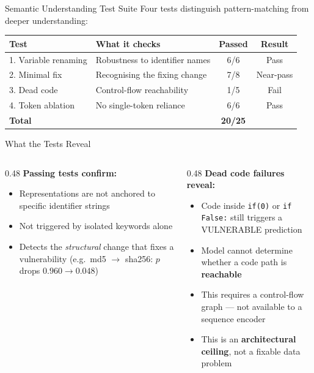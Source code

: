 \documentclass[aspectratio=169]{beamer}
\newcommand{\good}[1]{\textcolor{green!60!black}{#1}}
\newcommand{\bad}[1]{\textcolor{red!70!black}{#1}}
\begin{document}
\begin{frame}{Semantic Understanding Test Suite}
  Four tests distinguish pattern-matching from deeper understanding:

  \vspace{0.5em}
  \begin{center}
    \begin{tabular}{llcc}
      \toprule
      \textbf{Test} & \textbf{What it checks} & \textbf{Passed} & \textbf{Result} \\
      \midrule
      1. Variable renaming  & Robustness to identifier names & 6/6  & \good{Pass} \\
      2. Minimal fix        & Recognising the fixing change   & 7/8  & \good{Near-pass} \\
      3. Dead code          & Control-flow reachability       & 1/5  & \bad{Fail} \\
      4. Token ablation     & No single-token reliance        & 6/6  & \good{Pass} \\
      \midrule
      \textbf{Total}        &                                 & \textbf{20/25} & \\
      \bottomrule
    \end{tabular}
  \end{center}
\end{frame}

\begin{frame}{What the Tests Reveal}
  \begin{columns}
    \begin{column}{0.48\textwidth}
      \textbf{\good{Passing tests confirm:}}
      \begin{itemize}
        \item Representations are not anchored to specific identifier strings
        \item Not triggered by isolated keywords alone
        \item Detects the \emph{structural} change that fixes a vulnerability
          (e.g.\ md5 $\to$ sha256: $p$ drops $0.960 \to 0.048$)
      \end{itemize}
    \end{column}
    \begin{column}{0.48\textwidth}
      \textbf{\bad{Dead code failures reveal:}}
      \begin{itemize}
        \item Code inside \texttt{if(0)} or \texttt{if False:} still triggers a VULNERABLE prediction
        \item Model cannot determine whether a code path is \textbf{reachable}
        \item This requires a control-flow graph --- not available to a sequence encoder
        \item This is an \textbf{architectural ceiling}, not a fixable data problem
      \end{itemize}
    \end{column}
  \end{columns}
\end{frame}
\end{document}

